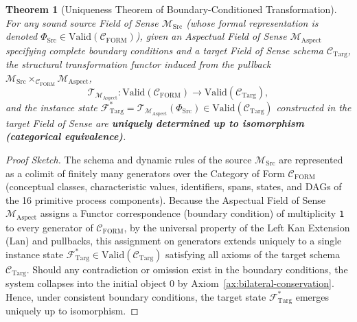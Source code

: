 \documentclass[11pt,a4paper]{article}
\theoremstyle{definition}
\theoremstyle{plain}
\newtheorem{theorem}{Theorem}[section]
\theoremstyle{remark}
\newcommand{\Valid}{\mathrm{Valid}}
\newcommand{\CFORM}{\mathcal{C}_{\mathrm{FORM}}}
\newcommand{\CTarg}{\mathcal{C}_{\mathrm{Targ}}}
\newcommand{\MSrc}{\mathcal{M}_{\mathrm{Src}}}
\newcommand{\MAspect}{\mathcal{M}_{\mathrm{Aspect}}}
\begin{document}
\begin{theorem}[Uniqueness Theorem of Boundary-Conditioned Transformation]\label{thm:unique-transformation}
For any sound source Field of Sense $\MSrc$ (whose formal representation is denoted $\Phi_{\mathrm{Src}} \in \Valid(\CFORM)$), given an Aspectual Field of Sense $\MAspect$ specifying complete boundary conditions and a target Field of Sense schema $\CTarg$, the structural transformation functor induced from the pullback $\MSrc \times_{\CFORM} \MAspect$,
\begin{equation}
\mathcal{T}_{\MAspect} : \Valid(\CFORM) \longrightarrow \Valid(\CTarg),
\end{equation}
and the instance state $\mathcal{F}_{\mathrm{Targ}}^* = \mathcal{T}_{\MAspect}(\Phi_{\mathrm{Src}}) \in \Valid(\CTarg)$ constructed in the target Field of Sense are \textbf{uniquely determined up to isomorphism (categorical equivalence)}.
\end{theorem}

\begin{proof}[Proof Sketch]
The schema and dynamic rules of the source $\MSrc$ are represented as a colimit of finitely many generators over the Category of Form $\CFORM$ (conceptual classes, characteristic values, identifiers, spans, states, and DAGs of the 16 primitive process components). Because the Aspectual Field of Sense $\MAspect$ assigns a Functor correspondence (boundary condition) of multiplicity \texttt{1} to every generator of $\CFORM$, by the universal property of the Left Kan Extension ($\mathrm{Lan}$) and pullbacks, this assignment on generators extends uniquely to a single instance state $\mathcal{F}_{\mathrm{Targ}}^* \in \Valid(\CTarg)$ satisfying all axioms of the target schema $\CTarg$. Should any contradiction or omission exist in the boundary conditions, the system collapses into the initial object $0$ by Axiom~\ref{ax:bilateral-conservation}. Hence, under consistent boundary conditions, the target state $\mathcal{F}_{\mathrm{Targ}}^*$ emerges uniquely up to isomorphism. \qedhere
\end{proof}
\end{document}
